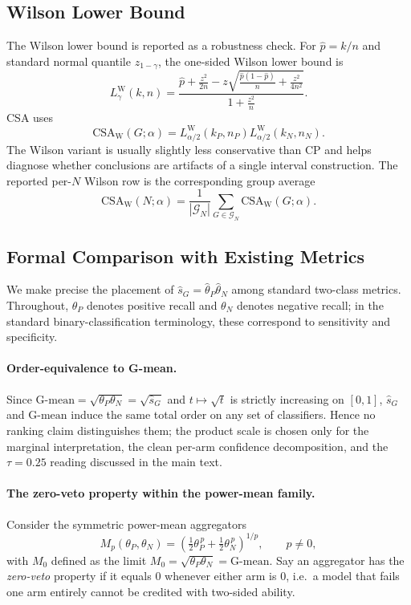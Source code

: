 \documentclass[10pt,conference]{IEEEtran}
\theoremstyle{remark}
\newcommand{\CSAW}{\mathrm{CSA}_{\mathrm{W}}}
\newcommand{\Gmean}{\mathrm{G\text{-}mean}}
\begin{document}
\subsection{Wilson Lower Bound}

The Wilson lower bound is reported as a robustness check.  For $\hat{p}=k/n$ and standard normal quantile $z_{1-\gamma}$, the one-sided Wilson lower bound is
\[
L^{\mathrm{W}}_{\gamma}(k,n)=
\frac{
\hat{p}+\frac{z^2}{2n}
-
z\sqrt{\frac{\hat{p}(1-\hat{p})}{n}+\frac{z^2}{4n^2}}
}{
1+\frac{z^2}{n}
}.
\]
CSA uses
\[
\CSAW(G;\alpha)=
L^{\mathrm{W}}_{\alpha/2}(k_P,n_P)
L^{\mathrm{W}}_{\alpha/2}(k_N,n_N).
\]
The Wilson variant is usually slightly less conservative than CP and helps diagnose whether conclusions are artifacts of a single interval construction.  The reported per-$N$ Wilson row is the corresponding group average
\[
\CSAW(N;\alpha)=\frac{1}{|\mathcal{G}_N|}\sum_{G\in\mathcal{G}_N}\CSAW(G;\alpha).
\]

\subsection{Formal Comparison with Existing Metrics}
\label{sec:supp-metric-rel}

We make precise the placement of $\hat s_G=\hat\theta_P\hat\theta_N$ among standard two-class metrics.  Throughout, $\theta_P$ denotes positive recall and $\theta_N$ denotes negative recall; in the standard binary-classification terminology, these correspond to sensitivity and specificity.

\paragraph{Order-equivalence to G-mean.}
Since $\Gmean=\sqrt{\theta_P\theta_N}=\sqrt{\hat s_G}$ and $t\mapsto\sqrt{t}$ is strictly increasing on $[0,1]$, $\hat s_G$ and $\Gmean$ induce the same total order on any set of classifiers.  Hence no ranking claim distinguishes them; the product scale is chosen only for the marginal interpretation, the clean per-arm confidence decomposition, and the $\tau=0.25$ reading discussed in the main text.

\paragraph{The zero-veto property within the power-mean family.}
Consider the symmetric power-mean aggregators
\[
M_p(\theta_P,\theta_N)=\left(\tfrac{1}{2}\theta_P^{\,p}+\tfrac{1}{2}\theta_N^{\,p}\right)^{1/p},\qquad p\neq 0,
\]
with $M_0$ defined as the limit $M_0=\sqrt{\theta_P\theta_N}=\Gmean$.  Say an aggregator has the \emph{zero-veto} property if it equals $0$ whenever either arm is $0$, i.e.\ a model that fails one arm entirely cannot be credited with two-sided ability.
\end{document}
